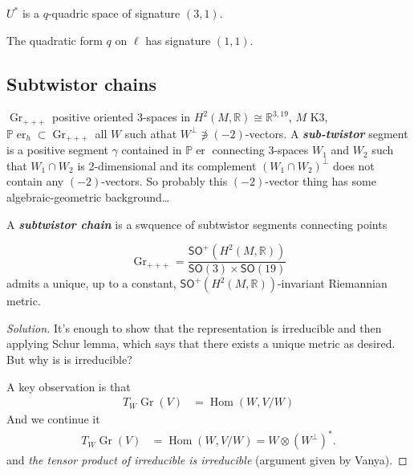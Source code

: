 \begin{remark}\leavevmode
	$U^*$ is a $q$-quadric space of signature $(3,1)$.
\end{remark}

\begin{claim}\leavevmode
	The quadratic form $q$ on $\ell$ has signature $(1,1)$.
\end{claim}

\subsection{Subtwistor chains}

\begin{defn}\leavevmode
$\operatorname{Gr}_{+ + +}$ positive oriented 3-spaces in $H^{2}(M,\mathbb{R})\cong \mathbb{R}^{3,19}$, $M$ K3, $\mathbb{P}\operatorname{er}_{h}\subset \operatorname{Gr}_{+ + +}$ all $W$ such athat $W^\perp \not\ni(-2)$-vectors. A \textit{\textbf{sub-twistor}} segment is a positive segment $\gamma$ contained in $\mathbb{P}\operatorname{er}$ connecting 3-spaces $W_1$ and $W_2$ such that $W_1 \cap W_2$ is 2-dimensional and its complement $(W_1\cap W_2)^\perp$ does not contain any $(-2)$-vectors. {\color{4}So probably this $(-2)$-vector thing has some algebraic-geometric background…}
\end{defn}

\begin{defn}\leavevmode
	A \textit{\textbf{subtwistor chain}} is a swquence of subtwistor segments connecting points
\end{defn}

\begin{exercise}\leavevmode
\[\operatorname{Gr}_{+ + +}=\dfrac{\mathsf{SO}^+(H^{2}(M,\mathbb{R}))}{\mathsf{SO}(3)\times \mathsf{SO}(19)}\]
admits a unique, up to a constant, $\mathsf{SO}^+(H^{2}(M,\mathbb{R}))$-invariant Riemannian metric.
\end{exercise}

\begin{proof}[Solution]\leavevmode
It's enough to show that the representation is irreducible and then applying Schur lemma, which says that there exists a unique metric as desired. But why is is irreducible?

A key observation is that
\begin{align*}
T_W \operatorname{Gr}(V)&=\operatorname{Hom}(W,V/W)
\end{align*}
And we continue it
\begin{align*}
T_W \operatorname{Gr}(V)&=\operatorname{Hom}(W,V/W)=W \otimes (W^\perp )^*.
\end{align*}
and \textit{the tensor product of irreducible is irreducible}  (argument given by Vanya).
\end{proof}


